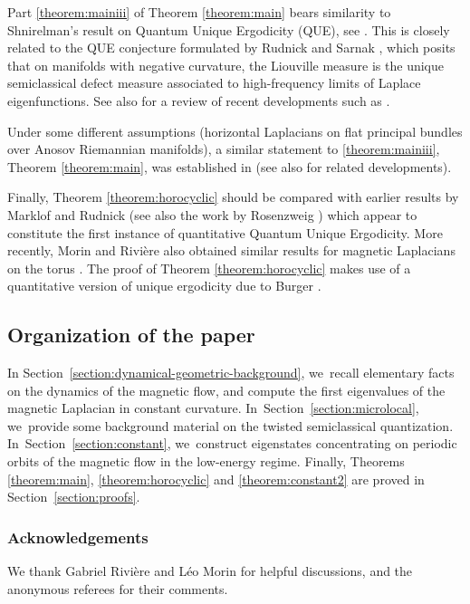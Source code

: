 \documentclass[10pt]{amsart}
\theoremstyle{plain}
\theoremstyle{definition}
\begin{document}
Part \eqref{theorem:mainiii} of Theorem \ref{theorem:main} bears similarity to Shnirelman's
result on Quantum Unique Ergodicity (QUE), see
\cite{Shnirelman-74-1,Shnirelman-74-2,Colindeverdiere-85,Zelditch-87}. This is closely related to the QUE
conjecture formulated by Rudnick and Sarnak \cite{Rudnick-Sarnak-94}, which
posits that on manifolds with negative curvature, the Liouville measure is the
unique semiclassical defect measure associated to high-frequency limits of
Laplace eigenfunctions. See also \cite{Dyatlov-22} for a review of recent developments {\color{black}such as \cite{Lindenstrauss-06,Anantharaman-08, Dyatlov-Jin-18}}.

Under some different assumptions (horizontal Laplacians on flat principal bundles over Anosov Riemannian manifolds), a similar statement to \eqref{theorem:mainiii}, Theorem \ref{theorem:main}, was established in \cite[Th.\,5.1.8]{Cekic-Lefeuvre-24} (see also \cite{Ma-Ma-23} for related developments).

Finally, Theorem \ref{theorem:horocyclic} should be compared with earlier results by Marklof and Rudnick \cite{Marklof-Rudnick-00} (see also the work by Rosenzweig \cite{Rosenzweig-06}) which appear to constitute the first instance of quantitative Quantum Unique Ergodicity. More recently, Morin and Rivière also obtained similar results for magnetic Laplacians on the torus \cite{Morin-Riviere-24}. The proof of Theorem \ref{theorem:horocyclic} makes use of a quantitative version of unique ergodicity due to Burger \cite{Burger-90}.

\subsection{Organization of the paper} In Section~\ref{section:dynamical-geometric-background}, we~recall elementary facts on the dynamics of the magnetic flow, and compute the first eigenvalues of the magnetic Laplacian in constant curvature. In~Section~\ref{section:microlocal}, we~provide some background material on the twisted semiclassical quantization. In~Section~\ref{section:constant}, we~construct eigenstates concentrating on periodic orbits of the magnetic flow in the low-energy regime. Finally, Theorems \ref{theorem:main}, \ref{theorem:horocyclic} and \ref{theorem:constant2} are proved in Section~\ref{section:proofs}.

\subsubsection*{Acknowledgements} We thank Gabriel Rivière and Léo Morin for helpful discussions, and the anonymous referees for their comments.
\end{document}
